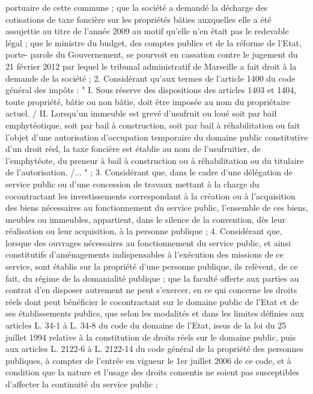\documentclass[11pt,a4paper]{report}
\begin{document}
portuaire de cette commune ; que la société a demandé la décharge des cotisations de taxe foncière sur
les propriétés bâties auxquelles elle a été assujettie au titre de l'année 2009 au motif qu'elle n'en était
pas le redevable légal ; que le ministre du budget, des comptes publics et de la réforme de l'Etat, porte-
parole du Gouvernement, se pourvoit en cassation contre le jugement du 21 février 2012 par lequel le
tribunal administratif de Marseille a fait droit à la demande de la société ;
2. Considérant qu'aux termes de l'article 1400 du code général des impôts : " I. Sous réserve des
dispositions des articles 1403 et 1404, toute propriété, bâtie ou non bâtie, doit être imposée au nom du
propriétaire actuel. / II. Lorsqu'un immeuble est grevé d'usufruit ou loué soit par bail emphytéotique,
soit par bail à construction, soit par bail à réhabilitation ou fait l'objet d'une autorisation d'occupation
temporaire du domaine public constitutive d'un droit réel, la taxe foncière est établie au nom de
l'usufruitier, de l'emphytéote, du preneur à bail à construction ou à réhabilitation ou du titulaire de
l'autorisation. /... " ;
3. Considérant que, dans le cadre d'une délégation de service public ou d'une concession de travaux
mettant à la charge du cocontractant les investissements correspondant à la création ou à l'acquisition
des biens nécessaires au fonctionnement du service public, l'ensemble de ces biens, meubles ou
immeubles, appartient, dans le silence de la convention, dès leur réalisation ou leur acquisition, à la
personne publique ;
4. Considérant que, lorsque des ouvrages nécessaires au fonctionnement du service public, et ainsi
constitutifs d'aménagements indispensables à l'exécution des missions de ce service, sont établis sur la
propriété d'une personne publique, ils relèvent, de ce fait, du régime de la domanialité publique ; que la
faculté offerte aux parties au contrat d'en disposer autrement ne peut s'exercer, en ce qui concerne les
droits réels dont peut bénéficier le cocontractant sur le domaine public de l'Etat et de ses établissements
publics, que selon les modalités et dans les limites définies aux articles L. 34-1 à L. 34-8 du code du
domaine de l'Etat, issus de la loi du 25 juillet 1994 relative à la constitution de droits réels sur le
domaine public, puis aux articles L. 2122-6 à L. 2122-14 du code général de la propriété des personnes
publiques, à compter de l'entrée en vigueur le 1er juillet 2006 de ce code, et à condition que la nature et
l'usage des droits consentis ne soient pas susceptibles d'affecter la continuité du service public ;
\end{document}
